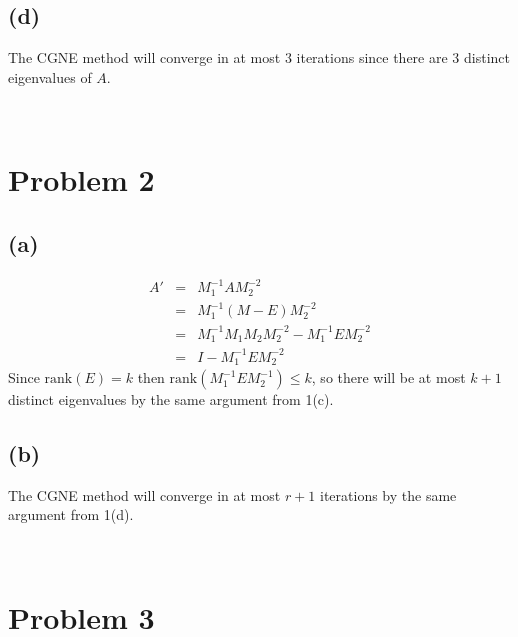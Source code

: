 \documentclass[11pt]{article}
\theoremstyle{definition}
\theoremstyle{remark}
\newcommand{\newquestion}{\hrulefill\vspace{-0.8\baselineskip}\\\null\hrulefill\vspace{-1.0\baselineskip}}
\newcommand{\newpart}{\vspace{-0.5\baselineskip}\hrulefill\vspace{-1.3\baselineskip}}
\theoremstyle{plain}
\begin{document}
\newpart
\subsection*{(d)}
The CGNE method will converge in at most 3 iterations since there are 3 distinct eigenvalues of $A$.

\newquestion
%
%
\section*{Problem 2}

\newpart
\subsection*{(a)}
\begin{eqnarray*}
  A'&=&M_1^{-1}AM_2^{-2}\\
    &=&M_1^{-1}\left(M-E\right)M_2^{-2}\\
    &=&M_1^{-1}M_1M_2M_2^{-2}-M_1^{-1}EM_2^{-2}\\
    &=&I-M_1^{-1}EM_2^{-2}
\end{eqnarray*}
Since $\textrm{rank}\left(E\right)=k$ then $\textrm{rank}\left(M_1^{-1}EM_2^{-1}\right)\leq k$, so there will be at most $k+1$ distinct eigenvalues by the same argument from 1(c). 

\newpart
\subsection*{(b)}
The CGNE method will converge in at most $r+1$ iterations by the same argument from 1(d).

\newpage\newquestion
%
%
\section*{Problem 3}
\end{document}
